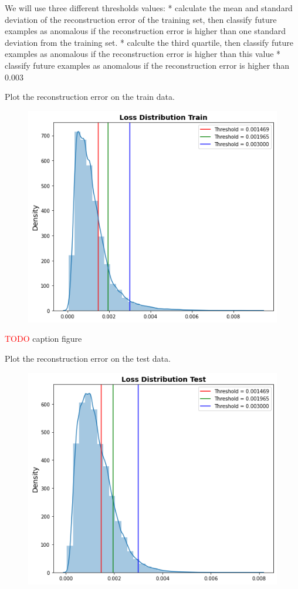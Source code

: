 We will use three different thresholds values:
* calculate the mean and standard deviation of the reconstruction error of the training set, then classify future examples as anomalous if the reconstruction error is higher than one standard deviation from the training set.
* calculte the third quartile, then classify future examples as anomalous if the reconstruction error is higher than  this value
* classify future examples as anomalous if the reconstruction error is higher than  0.003

Plot the reconstruction error on the train data.

\begin{figure}[H]
\centering
  \includegraphics[scale=0.4]{img/task_2/train_loss.png}
  \caption{}
  \label{fig: }
\end{figure}

\textcolor{red}{TODO} caption figure

Plot the reconstruction error on the test data.

\begin{figure}[H]
\centering
  \includegraphics[scale=0.4]{img/task_2/test_loss.png}
  \caption{}
  \label{fig: }
\end{figure}

